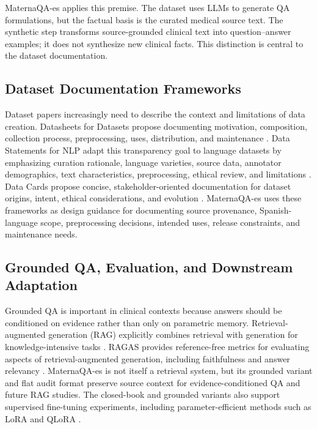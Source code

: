 \documentclass[conference]{IEEEtran}
\begin{document}
MaternaQA-es applies this premise. The dataset uses LLMs to generate QA formulations, but the factual basis is the curated medical source text. The synthetic step transforms source-grounded clinical text into question--answer examples; it does not synthesize new clinical facts. This distinction is central to the dataset documentation.

\subsection{Dataset Documentation Frameworks}
Dataset papers increasingly need to describe the context and limitations of data creation. Datasheets for Datasets propose documenting motivation, composition, collection process, preprocessing, uses, distribution, and maintenance \cite{Gebru2021Datasheets}. Data Statements for NLP adapt this transparency goal to language datasets by emphasizing curation rationale, language varieties, source data, annotator demographics, text characteristics, preprocessing, ethical review, and limitations \cite{Bender2018DataStatements}. Data Cards propose concise, stakeholder-oriented documentation for dataset origins, intent, ethical considerations, and evolution \cite{Pushkarna2022DataCards}. MaternaQA-es uses these frameworks as design guidance for documenting source provenance, Spanish-language scope, preprocessing decisions, intended uses, release constraints, and maintenance needs.

\subsection{Grounded QA, Evaluation, and Downstream Adaptation}
Grounded QA is important in clinical contexts because answers should be conditioned on evidence rather than only on parametric memory. Retrieval-augmented generation (RAG) explicitly combines retrieval with generation for knowledge-intensive tasks \cite{Lewis2020RAG}. RAGAS provides reference-free metrics for evaluating aspects of retrieval-augmented generation, including faithfulness and answer relevancy \cite{Es2024RAGAS}. MaternaQA-es is not itself a retrieval system, but its grounded variant and flat audit format preserve source context for evidence-conditioned QA and future RAG studies. The closed-book and grounded variants also support supervised fine-tuning experiments, including parameter-efficient methods such as LoRA and QLoRA \cite{Hu2022LoRA,Dettmers2023QLoRA}.
\end{document}
